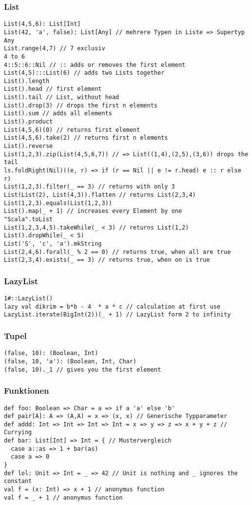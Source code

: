 \subsubsection{List}
\begin{verbatim}
List(4,5,6): List[Int]
List(42, 'a', false): List[Any] // mehrere Typen in Liste => Supertyp Any
List.range(4,7) // 7 exclusiv
4 to 6
4::5::6::Nil // :: adds or removes the first element
List(4,5):::List(6) // adds two Lists together
List().length
List().head // first element
List().tail // List, without head
List().drop(3) // drops the first n elements
List().sum // adds all elements
List().product
List(4,5,6)(0) // returns first element
List(4,5,6).take(2) // returns first n elements
List().reverse
List(1,2,3).zip(List(4,5,6,7)) // => List((1,4),(2,5),(3,6)) drops the tail
ls.foldRight(Nil)((e, r) => if (r == Nil || e != r.head) e :: r else r)
List(1,2,3).filter(_ == 3) // returns with only 3
List(List(2), List(4,3)).flatten // returns List(2,3,4)
List(1,2,3).equals(List(1,2,3))
List().map(_ + 1) // increases every Element by one
"Scala".toList
List(1,2,3,4,5).takeWhile(_ < 3) // returns List(1,2)
List().dropWhile(_ < 5)
List('S', 'c', 'a').mkString
List(2,4,6).forall(_ % 2 == 0) // returns true, when all are true
List(2,3,4).exists(_ == 3) // returns true, when on is true
\end{verbatim}
\subsubsection{LazyList}
\begin{verbatim}
1#::LazyList()
lazy val dikrim = b*b - 4  * a * c // calculation at first use
LazyList.iterate(BigInt(2))(_ + 1) // LazyList form 2 to infinity
\end{verbatim}
\subsubsection{Tupel}
\begin{verbatim}
(false, 10): (Boolean, Int)
(false, 10, 'a'): (Boolean, Int, Char)
(false, 10)._1 // gives you the first element
\end{verbatim}
\subsubsection{Funktionen}
\begin{verbatim}
def foo: Boolean => Char = a => if a 'a' else 'b'
def pair[A]: A => (A,A) = x => (x, x) // Generische Typparameter
def addd: Int => Int => Int => Int = x => y => z => x + y + z // Currying
def bar: List[Int] => Int = { // Mustervergleich
  case a::as => 1 + bar(as)
  case a => 0
}
def lol: Unit => Int = _ => 42 // Unit is nothing and _ ignores the constant
val f = (x: Int) => x + 1 // anonymus function
val f = _ + 1 // anonymus function
\end{verbatim}
